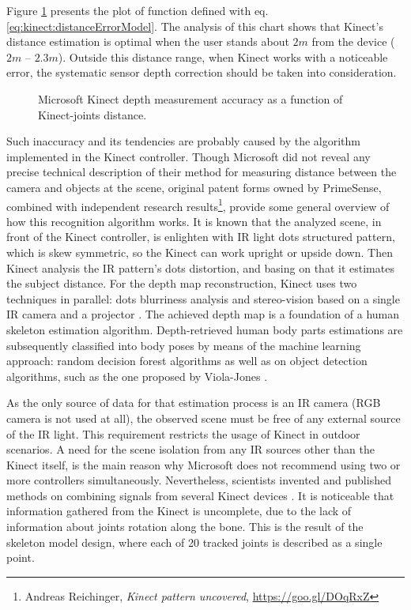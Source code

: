 \documentclass[sensors,article,submit,moreauthors,pdftex,10pt,a4paper]{mdpi}
\begin{document}
Figure \ref{fig:kinect:distanceAccuracy} presents the plot of function defined with eq. \ref{eq:kinect:distanceErrorModel}. The analysis of this chart shows that Kinect’s distance estimation is optimal when the user stands about $2m$ from the device ($2m$ – $2.3m$). Outside this distance range, when Kinect works with a noticeable error, the systematic sensor depth correction should be taken into consideration.

\begin{figure}[H] %
	\centering	
											
	\caption{Microsoft Kinect depth measurement accuracy as a function of Kinect-joints distance.}
	\label{fig:kinect:distanceAccuracy}
\end{figure}

Such inaccuracy and its tendencies are probably caused by the algorithm implemented in the Kinect controller. Though Microsoft did not reveal any precise technical description of their method for measuring distance between the camera and objects at the scene, original patent forms \cite{patent:20100118123,patent:20100020078,patent:20080106746} owned by PrimeSense, combined with independent research results\footnote{Andreas Reichinger, \textit{Kinect pattern uncovered}, \url{https://goo.gl/DOqRxZ}}, provide some general overview of how this recognition algorithm works. It is known that the analyzed scene, in front of the Kinect controller, is enlighten with IR light dots structured pattern, which is skew symmetric, so the Kinect can work upright or upside down. Then Kinect analysis the IR pattern’s dots distortion, and basing on that it estimates the subject distance. For the depth map reconstruction, Kinect uses two techniques in parallel: dots blurriness analysis \cite{Fofi2004} and stereo-vision based on a single IR camera and a projector \cite{Rzeszotarski2006}. The achieved depth map is a foundation of a human skeleton estimation algorithm. Depth-retrieved human body parts estimations are subsequently classified into body poses by means of the machine learning approach: random decision forest algorithms as well as on object detection algorithms, such as the one proposed by Viola-Jones \cite{Shotton2008, Shotton2011a}. 

As the only source of data for that estimation process is an IR camera (RGB camera is not used at all), the observed scene must be free of any external source of the IR light. This requirement restricts the usage of Kinect in outdoor scenarios. A need for the scene isolation from any IR sources other than the Kinect itself, is the main reason why Microsoft does not recommend using two or more controllers simultaneously. Nevertheless, scientists invented and published methods on combining signals from several Kinect devices \cite{Asteriadis2013,Kitsikidis2011,Schroder2011}. It is noticeable that information gathered from the Kinect is uncomplete, due to the lack of information about joints rotation along the bone. This is the result of the skeleton model design, where each of 20 tracked joints is described as a single point.
\end{document}
